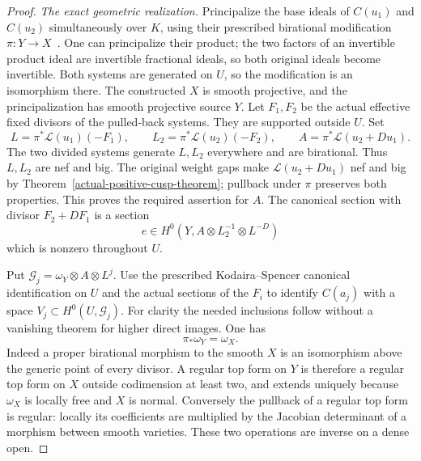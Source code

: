 \begin{proof}
\emph{The exact geometric realization.}
Principalize the base ideals of $C(u_1)$ and $C(u_2)$
simultaneously over $K$, using their prescribed birational
modification $\pi:Y\to X$~\cite{WlodarczykResolution}.
One can principalize their product; the two factors of an invertible
product ideal are invertible fractional ideals, so both original
ideals become invertible.  Both systems are generated on $U$, so
the modification is an isomorphism there.  The constructed $X$
is smooth projective, and the principalization has smooth projective
source $Y$.  Let $F_1,F_2$ be the actual effective fixed divisors of
the pulled-back systems.  They are supported outside $U$.  Set
\begin{equation}\label{eq:actual-section-lines}
 L=\pi^*\mathcal L(u_1)(-F_1),\qquad
 L_2=\pi^*\mathcal L(u_2)(-F_2),\qquad
 A=\pi^*\mathcal L(u_2+Du_1).
\end{equation}
The two divided systems generate $L,L_2$ everywhere and are
birational.  Thus $L,L_2$ are nef and big.  The original weight gaps
make $\mathcal L(u_2+Du_1)$ nef and big by
Theorem~\ref{actual-positive-cusp-theorem}; pullback under $\pi$
preserves both properties.  This proves the required assertion for
$A$.  The canonical section with divisor $F_2+DF_1$ is a section
\[
            e\in H^0(Y,A\otimes L_2^{-1}\otimes L^{-D})
\]
which is nonzero throughout $U$.

Put $\mathcal G_j=\omega_Y\otimes A\otimes L^j$.
Use the prescribed Kodaira--Spencer canonical identification on $U$
and the actual sections of the $F_i$ to identify $C(a_j)$ with
a space $V_j\subset H^0(U,\mathcal G_j)$.
For clarity the needed inclusions follow without a vanishing
theorem for higher direct images.  One has
\begin{equation}\label{eq:actual-section-canonical-pushforward}
                         \pi_*\omega_Y=\omega_X.
\end{equation}
Indeed a proper birational morphism to the smooth $X$ is an
isomorphism above the generic point of every divisor.  A regular
top form on $Y$ is therefore a regular top form on $X$ outside
codimension at least two, and extends uniquely because $\omega_X$
is locally free and $X$ is normal.  Conversely the pullback of a
regular top form is regular: locally its coefficients are multiplied
by the Jacobian determinant of a morphism between smooth varieties.
These two operations are inverse on a dense open.


\end{proof}

